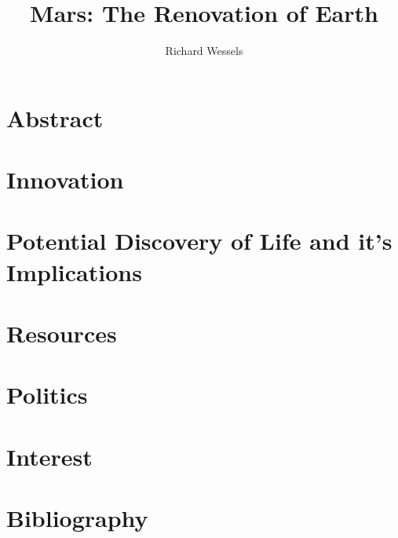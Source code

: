 \documentclass[12pt]{report}
\begin{document}
\title{\Huge Mars: The Renovation of Earth}
\author{Richard Wessels}
\date{}
\maketitle

\tableofcontents
\newpage
{}

\section{Abstract}


\newpage

\section{Innovation}


\newpage

\section{Potential Discovery of Life and it's Implications}


\newpage

\section{Resources}


\newpage

\section{Politics}


\newpage

\section{Interest}


\newpage

\section{Bibliography}

\end{document}
